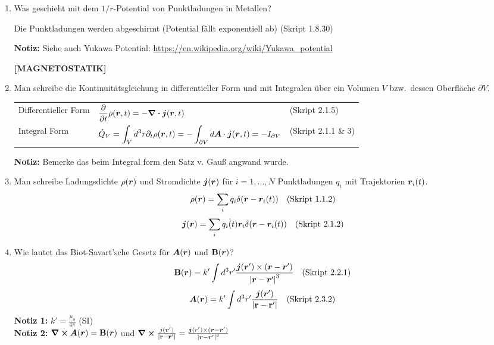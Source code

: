 \begin{enumerate}
  \item Was geschieht mit dem $1/r$-Potential von Punktladungen in
        Metallen?
        \begin{center}
          Die Punktladungen werden abgeschirmt (Potential fällt 
          exponentiell ab)
          (Skript 1.8.30)
        \end{center}
        \textbf{Notiz:} Siehe auch Yukawa Potential: 
        \url{https://en.wikipedia.org/wiki/Yukawa_potential} 

  \clearpage
  \textbf{[MAGNETOSTATIK]}
  \item Man schreibe die Kontinuitätsgleichung in differentieller Form
        und mit Integralen über ein Volumen $V$ bzw.\ dessen Oberfläche 
        $\partial V$.
        \begin{center}
        \begin{tabular}{lll}
          Differentieller Form 
                            & $\displaystyle\pdv{t}\rho(\vb* r, t)=
                               -\div\vb* j(\vb* r, t)$
                              & (Skript 2.1.5)\\
          Integral Form     & $\displaystyle\dot Q_V
                              =\int_V d^3r\partial_t\rho(\vb* r,t)=
                              -\int_{\partial V}d\vb* A\cdot
                              \vb* j(\vb* r, t)=-I_{\partial V}$
                              & (Skript 2.1.1 \& 3)\\
        \end{tabular}
        \end{center}
        \textbf{Notiz:} Bemerke das beim Integral form den Satz v. Gauß
        angwand wurde.

  \item Man schreibe Ladungsdichte $\rho(\vb* r)$ und Stromdichte
        $\vb* j(\vb* r)$ für $i=1,\ldots,N$ Punktladungen $q_i$ mit 
        Trajektorien $\vb* r_i(t)$.
        $$\rho(\vb* r)=\sum_i q_i\delta(\vb* r-\vb* r_i(t))
        \quad \text{(Skript 1.1.2)}$$
        $$\vb* j(\vb* r)=\sum_i q_i\dot(t){\vb* r}_i\delta(\vb* r-\vb* r_i(t))
        \quad \text{(Skript 2.1.2)}$$

  \item Wie lautet das Biot-Savart'sche Gesetz für $\vb* A(\vb* r)$ und
        $\vb B(\vb* r)$?
        $$\vb B(\vb* r)=k'\int d^3r'\frac{\vb* j(\vb* r')\times
        (\vb* r-\vb* r')}{\abs{\vb* r-\vb* r'}^3}
        \quad \text{(Skript 2.2.1)}$$
        $$\vb* A(\vb* r)=k'\int d^3r'\frac{\vb* j(\vb* r')}{\abs{\vb{r}-\vb{r}'}}
        \quad \text{(Skript 2.3.2)}$$
        \textbf{Notiz 1:} $k'=\frac{\mu_0}{4\pi}$ (SI)\\
        \textbf{Notiz 2:} $\curl \vb* A(\vb* r) = \vb B(\vb* r)$ und 
        $\curl \frac{j(\vb* r')}{\abs{\vb{r}-\vb{r}'}}
        =\frac{\vb* j(r') \times (\vb* r - \vb* r')}{\abs{\vb* r - \vb* r'}^3}$


\end{enumerate}
